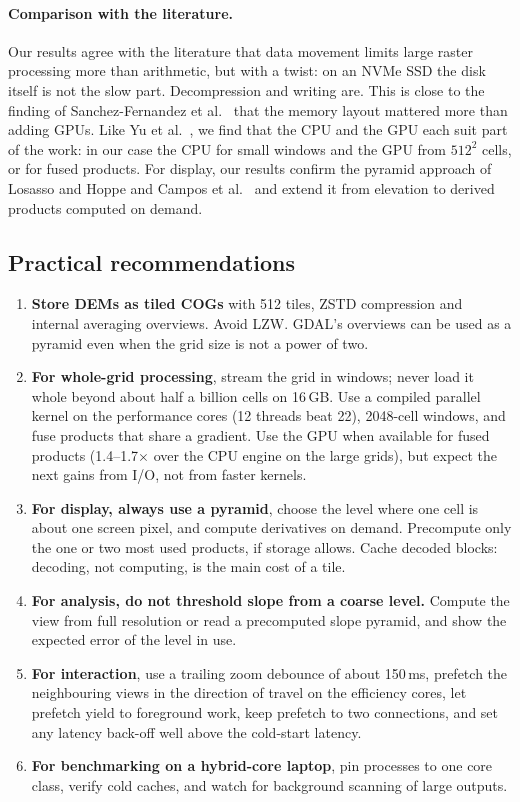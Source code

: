 \documentclass[11pt,a4paper]{article}
\begin{document}
\paragraph{Comparison with the literature.} Our results agree with the literature that data movement limits large
raster processing more than arithmetic, but with a twist: on an NVMe SSD the disk itself is not the slow part.
Decompression and writing are. This is close to the finding of Sanchez-Fernandez et al.\ \cite{sanchez} that the
memory layout mattered more than adding GPUs. Like Yu et al.\ \cite{yu}, we find that the CPU and the GPU each suit
part of the work: in our case the CPU for small windows and the GPU from $512^2$ cells, or for fused products. For
display, our results confirm the pyramid approach of Losasso and Hoppe \cite{clipmaps} and Campos et al.\
\cite{campos} and extend it from elevation to derived products computed on demand.

\subsection{Practical recommendations}
\begin{enumerate}
  \item \textbf{Store DEMs as tiled COGs} with 512 tiles, ZSTD compression and internal averaging overviews. Avoid
  LZW. GDAL's overviews can be used as a pyramid even when the grid size is not a power of two.
  \item \textbf{For whole-grid processing}, stream the grid in windows; never load it whole beyond about half a
  billion cells on 16\,GB. Use a compiled parallel kernel on the performance cores (12 threads beat 22), 2048-cell
  windows, and fuse products that share a gradient. Use the GPU when available for fused products
  (1.4--1.7$\times$ over the CPU engine on the large grids), but expect the next gains from I/O, not from faster
  kernels.
  \item \textbf{For display, always use a pyramid}, choose the level where one cell is about one screen pixel, and
  compute derivatives on demand. Precompute only the one or two most used products, if storage allows. Cache
  decoded blocks: decoding, not computing, is the main cost of a tile.
  \item \textbf{For analysis, do not threshold slope from a coarse level.} Compute the view from full resolution or
  read a precomputed slope pyramid, and show the expected error of the level in use.
  \item \textbf{For interaction}, use a trailing zoom debounce of about 150\,ms, prefetch the neighbouring views in
  the direction of travel on the efficiency cores, let prefetch yield to foreground work, keep prefetch to two
  connections, and set any latency back-off well above the cold-start latency.
  \item \textbf{For benchmarking on a hybrid-core laptop}, pin processes to one core class, verify cold caches, and
  watch for background scanning of large outputs.
\end{enumerate}
\end{document}
